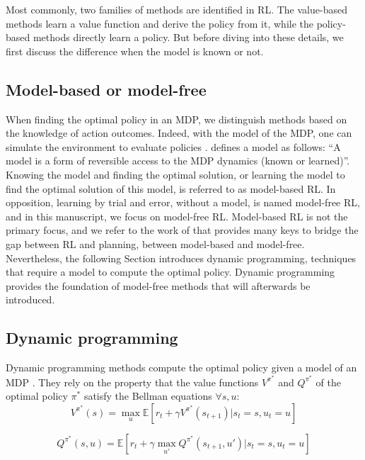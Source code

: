 Most commonly, two families of methods are identified in RL.
The value-based methods learn a value function and derive the policy from it, while the policy-based methods directly learn a policy.
But before diving into these details, we first discuss the difference when the model is known or not.


\subsection{Model-based or model-free}
\label{sec:ch2_model_based_vs_model_free}

When finding the optimal policy in an MDP, we distinguish methods based on the knowledge of action outcomes.
Indeed, with the model of the MDP, one can simulate the environment to evaluate policies \citep{sutton2018reinforcement}.
\cite{moerland2023model} defines a model as follows: ``A model is a form of reversible access to the MDP dynamics (known or learned)''.
Knowing the model and finding the optimal solution, or learning the model to find the optimal solution of this model, is referred to as model-based RL.
In opposition, learning by trial and error, without a model, is named model-free RL, and in this manuscript, we focus on model-free RL.
Model-based RL is not the primary focus, and we refer to the work of \cite{moerland2023model} that provides many keys to bridge the gap between RL and planning, between model-based and model-free.
Nevertheless, the following Section introduces dynamic programming, techniques that require a model to compute the optimal policy.
Dynamic programming provides the foundation of model-free methods that will afterwards be introduced.

\subsection{Dynamic programming}
Dynamic programming \citep{bellman1966dynamic} methods compute the optimal policy given a model of an MDP \citep{sutton2018reinforcement}.
They rely on the property that the value functions $V^{\pi^*}$ and $Q^{\pi^*}$ of the optimal policy ${\pi^*}$ satisfy the Bellman equations $\forall s, u$:
\begin{equation}
\label{eq:ch2_bellmanV}
    V^{\pi^*}(s) = \max_u \mathbb{E}[r_t + \gamma V^{\pi^*}(s_{t+1})| s_t=s, u_t=u]
\end{equation}

\begin{equation}
\label{eq:ch2_bellmanQ}
    Q^{\pi^*}(s, u) = \mathbb{E}[r_t + \gamma \max_{u'} Q^{\pi^*}(s_{t+1}, u') |s_t=s, u_t=u]
\end{equation}


